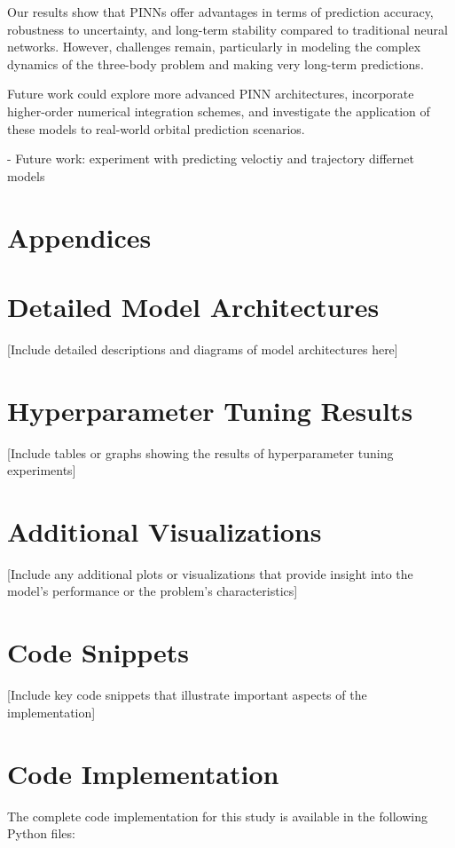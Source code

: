 \documentclass[12pt,a4paper]{article}
\begin{document}
Our results show that PINNs offer advantages in terms of prediction accuracy, robustness to uncertainty, and long-term stability compared to traditional neural networks. However, challenges remain, particularly in modeling the complex dynamics of the three-body problem and making very long-term predictions.

Future work could explore more advanced PINN architectures, incorporate higher-order numerical integration schemes, and investigate the application of these models to real-world orbital prediction scenarios.

- Future work: experiment with predicting veloctiy and trajectory differnet models


\section{Appendices}

\appendix

\section{Detailed Model Architectures}
\label{appendix:model_architectures}

[Include detailed descriptions and diagrams of model architectures here]

\section{Hyperparameter Tuning Results}
\label{appendix:hyperparameter_tuning}

[Include tables or graphs showing the results of hyperparameter tuning experiments]

\section{Additional Visualizations}
\label{appendix:additional_visualizations}

[Include any additional plots or visualizations that provide insight into the model's performance or the problem's characteristics]

\section{Code Snippets}
\label{appendix:code_snippets}

[Include key code snippets that illustrate important aspects of the implementation]
\section{Code Implementation}
\label{sec:appendix}
The complete code implementation for this study is available in the following Python files:
\end{document}
